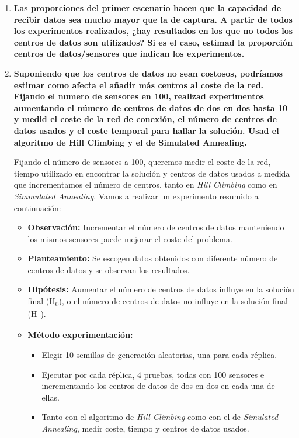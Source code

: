 \documentclass{article}
\begin{document}
\begin{enumerate}
  \item \textbf{Las proporciones del primer escenario hacen que la capacidad de recibir datos sea mucho mayor que la de captura. A partir de todos los experimentos realizados, ¿hay resultados en los que no todos los centros de datos son utilizados? Si es el caso, estimad la proporción centros de datos/sensores que indican los experimentos.}






  \item \textbf{Suponiendo que los centros de datos no sean costosos, podríamos estimar como afecta el añadir más centros al coste de la red. Fijando el numero de sensores en 100, realizad experimentos aumentando el número de centros de datos de dos en dos hasta 10 y medid el coste de la red de conexión, el número de centros de datos usados y el coste temporal para hallar la solución. Usad el algoritmo de Hill Climbing y el de Simulated Annealing.}

  Fijando el número de sensores a 100, queremos medir el coste de la red, tiempo utilizado en encontrar la solución y centros de datos usados a medida que incrementamos el número de centros, tanto en \textit{Hill Climbing} como en \textit{Simmulated Annealing}. Vamos a realizar un experimento resumido a continuación:
  \begin{itemize}
      \item \textbf{Observación:} Incrementar el número de centros de datos manteniendo los mismos sensores puede mejorar el coste del problema.
      \item \textbf{Planteamiento:} Se escogen datos obtenidos con diferente número de centros de datos y se observan los resultados.
      \item \textbf{Hipótesis:} Aumentar el número de centros de datos influye en la solución final (H\textsubscript{0}), o el número de centros de datos no influye en la solución final (H\textsubscript{1}).
      \item \textbf{Método experimentación:}
        \begin{itemize}
            \item Elegir 10 semillas de generación aleatorias, una para cada réplica.
            \item Ejecutar por cada réplica, 4 pruebas, todas con 100 sensores e incrementando los centros de datos de dos en dos en cada una de ellas.
            \item Tanto con el algoritmo de \textit{Hill Climbing} como con el de \textit{Simulated Annealing}, medir coste, tiempo y centros de datos usados.
        \end{itemize}
  \end{itemize}


\end{enumerate}
\end{document}
